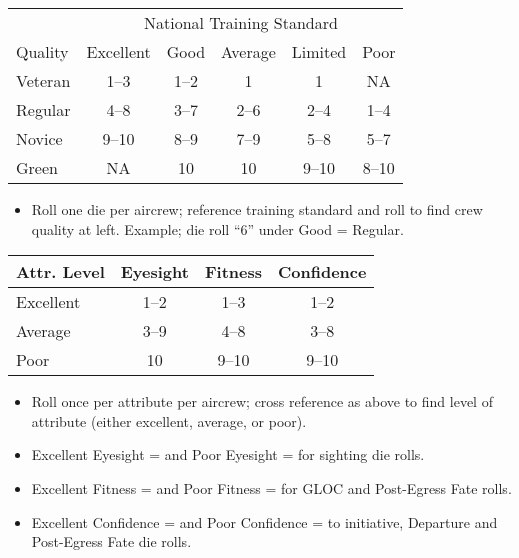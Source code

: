 
\begin{onecolumntablefloat}[p]
\begin{onecolumntable}
\small
\begin{tabularx}{\linewidth}{l*{5}{c}}
\toprule
&\multicolumn{5}{c}{National Training Standard}\\
\cmidrule(){2-6}
Quality&Excellent&Good&Average&Limited&Poor\\
\midrule
Veteran&1--3&1--2&1&1&NA\\
Regular&4--8&3--7&2--6&2--4&1--4\\
Novice&9--10&8--9&7--9&5--8&5--7\\
Green&NA&10&10&9--10&8--10\\
\bottomrule
\end{tabularx}
\begin{tablenote}{\linewidth}
\begin{itemize}[nosep]
    \item Roll one die per aircrew; reference training standard and roll to find crew quality at left. Example; die roll “6” under Good = Regular.
\end{itemize}
\end{tablenote}
\end{onecolumntable}

\vspace{\floatsep}

\begin{onecolumntable}
\small
\begin{tabularx}{\linewidth}{lCCC}
\toprule
Attr. Level&Eyesight&Fitness&Confidence\\
\midrule
Excellent&1--2&1--3&1--2\\
Average&3--9&4--8&3--8\\
Poor&10&9--10&9--10\\
\bottomrule
\end{tabularx}
\begin{tablenote}{\linewidth}
\begin{itemize}[nosep]
    \item Roll once per attribute per aircrew; cross reference as above to find level of attribute (either excellent, average, or poor).
    \item Excellent Eyesight =  and Poor Eyesight =  for sighting die rolls.
    \item Excellent Fitness =  and Poor Fitness =  for GLOC and Post-Egress Fate rolls.
    \item Excellent Confidence =  and Poor Confidence =  to initiative, Departure and Post-Egress Fate die rolls.
\end{itemize}
\end{tablenote}
\end{onecolumntable}


\end{onecolumntablefloat}
